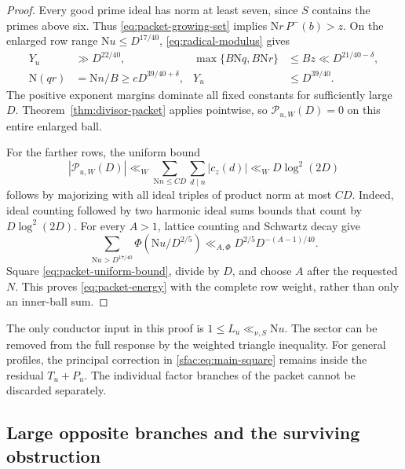 \documentclass[11pt]{article}
\numberwithin{equation}{section}
\theoremstyle{definition}
\theoremstyle{remark}
\newcommand{\N}{\mathrm N}
\begin{document}
\begin{proof}
Every good prime ideal has norm at least seven, since $S$ contains
the primes above six. Thus \eqref{eq:packet-growing-set} implies
$\N r\,P^-(b)>z$. On the enlarged row range
$\N u\le D^{17/40}$, \eqref{eq:radical-modulus} gives
\begin{align*}
 Y_u&\gg D^{22/40},&
 \max\{B\N q,B\N r\}&\le Bz\ll D^{21/40-\delta},\\
 \N(qr)&=\N n/B\ge cD^{39/40+\delta},&
 Y_u&\le D^{39/40}.
\end{align*}
The positive exponent margins dominate all fixed constants for
sufficiently large $D$. Theorem~\ref{thm:divisor-packet} applies
pointwise, so $\mathcal P_{u,W}(D)=0$ on this entire enlarged ball.

For the farther rows, the uniform bound
\begin{equation}\label{eq:packet-uniform-bound}
 |\mathcal P_{u,W}(D)|
 \ll_W\sum_{\N n\le CD}\sum_{d\mid n}|c_z(d)|
 \ll_W D\log^2(2D)
\end{equation}
follows by majorizing with all ideal triples of product norm at most
$CD$. Indeed, ideal counting followed by two harmonic ideal sums
bounds that count by $D\log^2(2D)$.
For every $A>1$, lattice counting and Schwartz decay give
\[
 \sum_{\N u>D^{17/40}}\Phi(\N u/D^{2/5})
 \ll_{A,\Phi}D^{2/5}D^{-(A-1)/40}.
\]
Square \eqref{eq:packet-uniform-bound}, divide by $D$, and choose
$A$ after the requested $N$. This proves \eqref{eq:packet-energy}
with the complete row weight, rather than only an inner-ball sum.
\end{proof}

The only conductor input in this proof is $1\le L_u\ll_{\nu,S}\N u$.
The sector can be removed from the full response by the weighted
triangle inequality. For general profiles, the principal correction in
\eqref{sfac:eq:main-square} remains inside the residual $T_u+P_u$.
The individual factor branches of the packet cannot be discarded
separately.

\subsection{Large opposite branches and the surviving obstruction}
\end{document}

